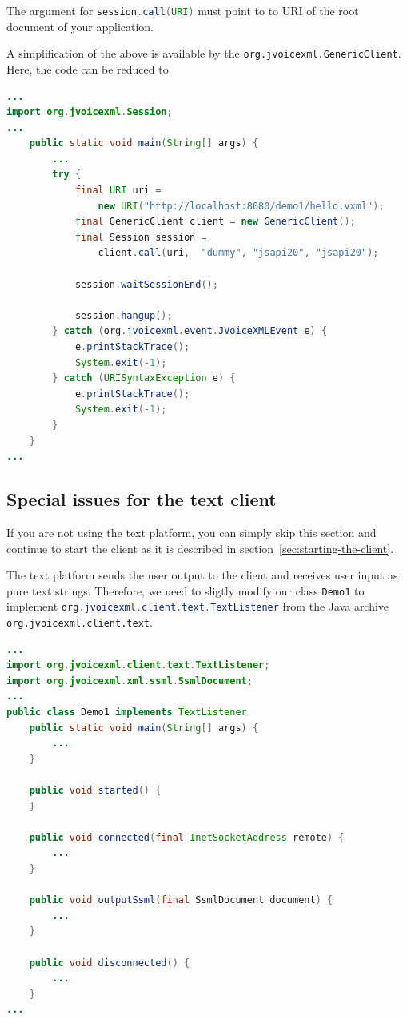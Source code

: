 \documentclass[11pt,a4paper]{book}
\begin{document}
The argument for \lstinline[language=Java]{session.call(URI)} must point to to URI of the
root document of your application.

A simplification of the above is available by the
\lstinline{org.jvoicexml.GenericClient}. Here, the code can be reduced to

\begin{lstlisting}[language=Java]
...
import org.jvoicexml.Session;
...
    public static void main(String[] args) {
        ...
        try {
            final URI uri = 
                new URI("http://localhost:8080/demo1/hello.vxml");
            final GenericClient client = new GenericClient();
            final Session session =
                client.call(uri,  "dummy", "jsapi20", "jsapi20");

            session.waitSessionEnd();

            session.hangup();
        } catch (org.jvoicexml.event.JVoiceXMLEvent e) {
            e.printStackTrace();
            System.exit(-1);
        } catch (URISyntaxException e) {
            e.printStackTrace();
            System.exit(-1);
        }
    }
...
\end{lstlisting}

\subsection{Special issues for the text client}

If you are not using the text platform, you can simply skip this section and
continue to start the client as it is described in
section~\ref{sec:starting-the-client}.

The text platform sends the user output to the client and receives user input as
pure text strings. Therefore, we need to sligtly modify our class
\lstinline[language=Java]{Demo1} to implement
\lstinline[language=Java]{org.jvoicexml.client.text.TextListener} from
the Java archive \lstinline{org.jvoicexml.client.text}. 

\begin{lstlisting}[language=Java]
...
import org.jvoicexml.client.text.TextListener;
import org.jvoicexml.xml.ssml.SsmlDocument;
...
public class Demo1 implements TextListener
    public static void main(String[] args) {
        ...
    }

    public void started() {
    }

    public void connected(final InetSocketAddress remote) {
        ...
    }

    public void outputSsml(final SsmlDocument document) {
        ...
    }

    public void disconnected() {
        ...
    }
...
\end{lstlisting}
\end{document}
